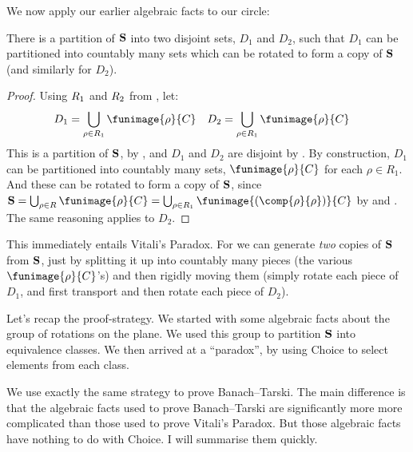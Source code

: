 \documentclass[../../../include/open-logic-section]{subfiles}
\begin{document}
We now apply our earlier algebraic facts to our circle:
\begin{lem}
	There is a partition of $\mathbf{S}$ into two disjoint sets, $D_{1}$ and $D_{2}$, such that $D_{1}$ can be partitioned into countably many sets which can be rotated to form a copy of $\mathbf{S}$ (and similarly for $D_{2}$).
\end{lem}
\begin{proof}
	Using $R_{1}$ and $R_{2}$ from , let:
	\begin{align*}
		D_{1} &= \bigcup_{\rho \in \rotationsgroup_1} \funimage{\rho}{C} & 
		D_{2} &= \bigcup_{\rho \in \rotationsgroup_1} \funimage{\rho}{C}
	\end{align*}
	This is a partition of $\mathbf{S}$, by , and $D_1$ and $D_2$ are disjoint by . By construction, $D_1$ can be partitioned into countably many sets, $\funimage{\rho}{C}$ for each $\rho \in R_1$. And these can be rotated to form a copy of $\mathbf{S}$, since $\onesphere = \bigcup_{\rho \in \rotationsgroup}\funimage{\rho}{C} = \bigcup_{\rho \in \rotationsgroup_1}\funimage{(\comp{\rho}{\rho})}{C}$ by  and . The same reasoning applies to $D_2$.
\end{proof}\noindent
This immediately entails Vitali's Paradox. For we can generate \emph{two} copies of $\mathbf{S}$ from $\mathbf{S}$, just by splitting it up into countably many pieces (the various $\funimage{\rho}{C}$'s) and then rigidly moving them (simply rotate each piece of $D_1$, and first transport and then rotate each piece of $D_2$).

Let's recap the proof-strategy. We started with some algebraic facts about the group of rotations on the plane. We used this group to partition $\mathbf{S}$ into equivalence classes. We then arrived at a ``paradox'', by using Choice to select elements from each class.

We use exactly the same strategy to prove Banach--Tarski. The main difference is that the algebraic facts used to prove Banach--Tarski are significantly more more complicated than those used to prove Vitali's Paradox. But those algebraic facts have nothing to do with Choice. I will summarise them quickly. 
\end{document}

